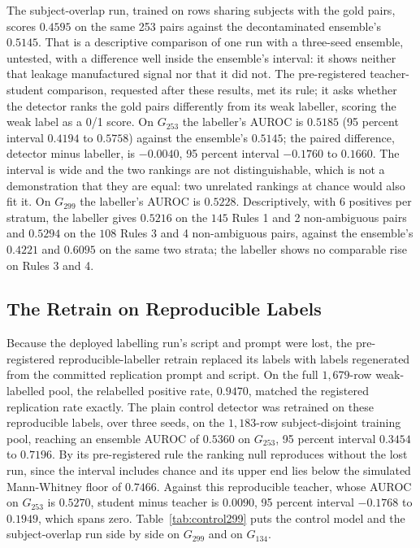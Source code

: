  The subject-overlap
run, trained on rows sharing subjects with the gold pairs, scores $0.4595$ on
the same 253 pairs against the decontaminated ensemble's $0.5145$. That is a
descriptive comparison of one run with a three-seed ensemble, untested, with a
difference well inside the ensemble's interval: it shows neither that leakage
manufactured signal nor that it did not. The pre-registered teacher-student
comparison, requested after these results, met its rule; it asks whether the detector ranks the gold pairs differently from its weak
labeller, scoring the weak label as a 0/1 score. On $G_{253}$ the labeller's
AUROC is $0.5185$ (95 percent interval $0.4194$ to $0.5758$) against the
ensemble's $0.5145$; the paired difference, detector minus labeller, is
$-0.0040$, 95 percent interval $-0.1760$ to $0.1660$. The interval is wide and
the two rankings are not distinguishable, which is not a demonstration that they
are equal: two unrelated rankings at chance would also fit it. On $G_{299}$ the labeller's AUROC is $0.5228$. Descriptively, with $6$
positives per stratum, the labeller gives $0.5216$ on the $145$ Rules 1 and 2
non-ambiguous pairs and $0.5294$ on the $108$ Rules 3 and 4 non-ambiguous
pairs, against the ensemble's $0.4221$ and $0.6095$ on the same two strata;
the labeller shows no comparable rise on Rules 3 and 4.

\subsection{The Retrain on Reproducible Labels}

Because the deployed labelling run's script and prompt were lost, the pre-registered
reproducible-labeller retrain replaced its labels with labels regenerated from the committed
replication prompt and script. On the full $1{,}679$-row weak-labelled pool, the relabelled
positive rate, $0.9470$, matched the registered replication rate exactly. The plain control
detector was retrained on these reproducible labels, over three seeds, on the $1{,}183$-row
subject-disjoint training pool, reaching an ensemble AUROC of $0.5360$ on
$G_{253}$, 95 percent interval $0.3454$ to $0.7196$. By its pre-registered rule the ranking null
reproduces without the lost run, since the interval includes chance and its upper end lies below
the simulated Mann-Whitney floor of $0.7466$. Against this reproducible teacher, whose AUROC on $G_{253}$ is $0.5270$,
student minus teacher is $0.0090$, 95 percent interval $-0.1768$ to $0.1949$, which spans zero.
Table~\ref{tab:control299} puts the control model and the subject-overlap run side by
side on $G_{299}$ and on $G_{134}$.

